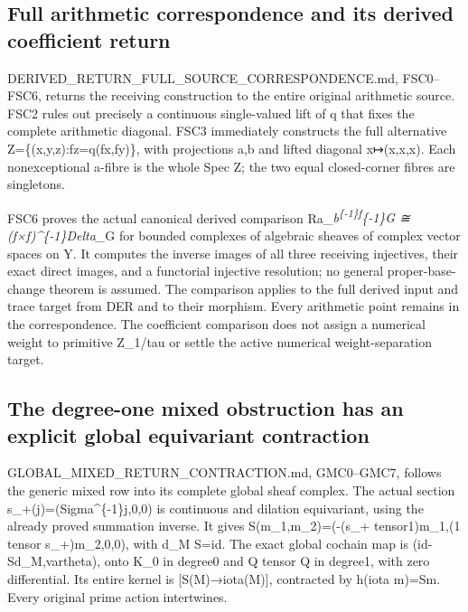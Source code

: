 \subsection{Full arithmetic correspondence and its derived coefficient
return}\label{full-arithmetic-correspondence-and-its-derived-coefficient-return}

DERIVED\_RETURN\_FULL\_SOURCE\_CORRESPONDENCE.md, FSC0--FSC6, returns
the receiving construction to the entire original arithmetic source.
FSC2 rules out precisely a continuous single-valued lift of q that fixes
the complete arithmetic diagonal. FSC3 immediately constructs the full
alternative Z=\{(x,y,z):fz=q(fx,fy)\}, with projections a,b and lifted
diagonal x↦(x,x,x). Each nonexceptional a-fibre is the whole Spec Z; the
two equal closed-corner fibres are singletons.

FSC6 proves the actual canonical derived comparison
Ra\_\emph{b\textsuperscript{\{-1\}f}\{-1\}G ≅ (f×f)\^{}\{-1\}Delta\_}G
for bounded complexes of algebraic sheaves of complex vector spaces on
Y. It computes the inverse images of all three receiving injectives,
their exact direct images, and a functorial injective resolution; no
general proper-base-change theorem is assumed. The comparison applies to
the full derived input and trace target from DER and to their morphism.
Every arithmetic point remains in the correspondence. The coefficient
comparison does not assign a numerical weight to primitive Z\_1/tau or
settle the active numerical weight-separation target.

\subsection{The degree-one mixed obstruction has an explicit global
equivariant
contraction}\label{the-degree-one-mixed-obstruction-has-an-explicit-global-equivariant-contraction}

GLOBAL\_MIXED\_RETURN\_CONTRACTION.md, GMC0--GMC7, follows the generic
mixed row into its complete global sheaf complex. The actual section
s\_+(j)=(Sigma\^{}\{-1\}j,0,0) is continuous and dilation equivariant,
using the already proved summation inverse. It gives
S(m\_1,m\_2)=(-(s\_+ tensor1)m\_1,(1 tensor s\_+)m\_2,0,0), with d\_M
S=id. The exact global cochain map is (id-Sd\_M,vartheta), onto K\_0 in
degree0 and Q tensor Q in degree1, with zero differential. Its entire
kernel is {[}S(M)→iota(M){]}, contracted by h(iota m)=Sm. Every original
prime action intertwines.

